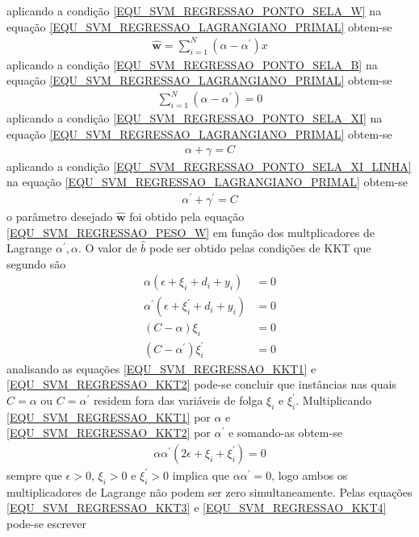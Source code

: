 aplicando a condição \eqref{EQU_SVM_REGRESSAO_PONTO_SELA_W} na equação \eqref{EQU_SVM_REGRESSAO_LAGRANGIANO_PRIMAL} obtem-se 
\begin{align}
\mathbf{\hat{w}} = \sum\limits_{i=1}^{N} (\alpha - \alpha^{'})x \label{EQU_SVM_REGRESSAO_PESO_W}
\end{align}
aplicando a condição \eqref{EQU_SVM_REGRESSAO_PONTO_SELA_B} na equação \eqref{EQU_SVM_REGRESSAO_LAGRANGIANO_PRIMAL} obtem-se 
\begin{align}
\sum\limits_{i=1}^{N} (\alpha - \alpha^{'}) = 0
\end{align}
aplicando a condição \eqref{EQU_SVM_REGRESSAO_PONTO_SELA_XI} na equação \eqref{EQU_SVM_REGRESSAO_LAGRANGIANO_PRIMAL} obtem-se 
\begin{align}
\alpha + \gamma = C
\end{align}
aplicando a condição \eqref{EQU_SVM_REGRESSAO_PONTO_SELA_XI_LINHA} na equação \eqref{EQU_SVM_REGRESSAO_LAGRANGIANO_PRIMAL} obtem-se 
\begin{align}
\alpha^{'} + \gamma^{'} = C
\end{align}
\noindent
o parâmetro desejado \(\mathbf{\hat{w}}\) foi obtido pela equação \eqref{EQU_SVM_REGRESSAO_PESO_W} em função dos multplicadores de Lagrange \(\alpha^{'}, \alpha\). O valor de \(\hat{b}\) pode ser obtido pelas condições de KKT que segundo  são
\begin{align}
\alpha(\epsilon + \xi_{i} + d_{i} + y_{i}) &= 0 \label{EQU_SVM_REGRESSAO_KKT1}\\
\alpha^{'}(\epsilon + \xi_{i}^{'} + d_{i} + y_{i}) &= 0 \label{EQU_SVM_REGRESSAO_KKT2}\\
(C-\alpha)\xi_{i} &= 0 \label{EQU_SVM_REGRESSAO_KKT3}\\
(C-\alpha^{'})\xi_{i}^{'} &= 0 \label{EQU_SVM_REGRESSAO_KKT4}
\end{align}
analisando as equações \eqref{EQU_SVM_REGRESSAO_KKT1} e \eqref{EQU_SVM_REGRESSAO_KKT2} pode-se concluir que instâncias nas quais \(C=\alpha\) ou \(C=\alpha^{'}\) residem fora das variáveis de folga \(\xi_{i}\) e \(\xi_{i}^{'}\). Multiplicando \eqref{EQU_SVM_REGRESSAO_KKT1} por \(\alpha\) e \eqref{EQU_SVM_REGRESSAO_KKT2} por \(\alpha^{'}\) e somando-as obtem-se
\begin{align}
\alpha\alpha^{'}(2\epsilon + \xi_{i} + \xi_{i}^{'})=0
\end{align}
sempre que \(\epsilon > 0\), \(\xi_{i} > 0\) e \(\xi_{i}^{'} > 0\) implica que \(\alpha\alpha^{'} = 0\), logo ambos os multiplicadores de Lagrange não podem ser zero simultaneamente. Pelas equações \eqref{EQU_SVM_REGRESSAO_KKT3} e \eqref{EQU_SVM_REGRESSAO_KKT4} pode-se escrever

